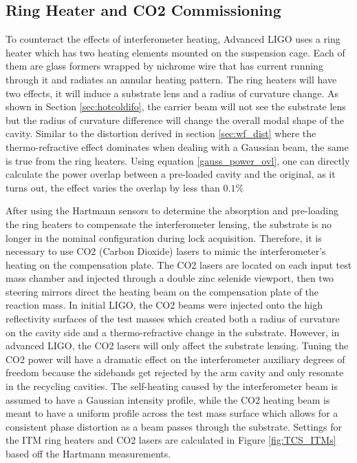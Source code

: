 	\subsection{Ring Heater and CO2 Commissioning}\label{Sec:RH}
	To counteract the effects of interferometer heating, Advanced LIGO uses a ring heater \cite{ramette_analytical} \cite{wang_thermalmodel} which has two heating elements mounted on the suspension cage. Each of them are glass formers wrapped by nichrome wire that has current running through it and radiates an annular heating pattern. The ring heaters will have two effects, it will induce a substrate lens and a radius of curvature change.  As shown in Section \ref{sec:hotcoldifo}, the carrier beam will not see the substrate lens but the radius of curvature difference will change the overall modal shape of the cavity.  Similar to the distortion derived in section \ref{sec:wf_dist} where the thermo-refractive effect dominates when dealing with a Gaussian beam, the same is true from the ring heaters. Using equation \ref{gauss_power_ovl}, one can directly calculate the power overlap between a pre-loaded cavity and the original, as it turns out, the effect varies the overlap by less than $0.1\%$

	After using the Hartmann sensors to determine the absorption and pre-loading the ring heaters to compensate the interferometer lensing, the substrate is no longer in the nominal configuration during lock acquisition.  Therefore, it is necessary to use CO2 (Carbon Dioxide) lasers to mimic the interferometer's heating on the compensation plate.  The CO2 lasers are located on each input test mass chamber and injected through a double zinc selenide viewport, then two steering mirrors direct the heating beam on the compensation plate of the reaction mass.  In initial LIGO, the CO2 beams were injected onto the high reflectivity surfaces of the test masses which created both a radius of curvature on the cavity side and a thermo-refractive change in the substrate.  However, in advanced LIGO, the CO2 lasers will only affect the substrate lensing.  Tuning the CO2 power will have a dramatic effect on the interferometer auxiliary degrees of freedom because the sidebands get rejected by the arm cavity and only resonate in the recycling cavities.  The self-heating caused by the interferometer beam is assumed to have a Gaussian intensity profile, while the CO2 heating beam is meant to have a uniform profile across the test mass surface which allows for a consistent phase distortion as a beam passes through the substrate.  Settings for the ITM ring heaters and CO2 lasers are calculated in Figure \ref{fig:TCS_ITMs} based off the Hartmann measurements.
	

